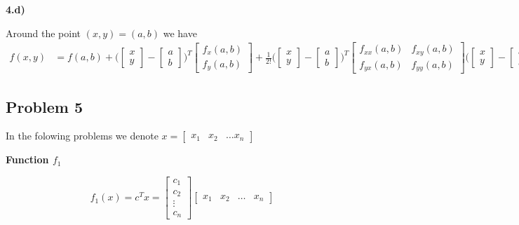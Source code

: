 \textbf{4.d)}

Around the point $(x, y) = (a, b)$ we have
\begin{align*}
f(x, y) &= f(a, b) + 
\Bigg( 
	\begin{bmatrix}
    	x \\
    	y
	\end{bmatrix}
	-
	\begin{bmatrix}
    	a \\
    	b
	\end{bmatrix}
\Bigg)^T
	\begin{bmatrix}
    	f_x(a,b) \\
    	f_y(a,b)
	\end{bmatrix}
+
\frac{1}{2!}
\Bigg( 
	\begin{bmatrix}
    	x \\
    	y
	\end{bmatrix}
	-
	\begin{bmatrix}
    	a \\
    	b
	\end{bmatrix}
\Bigg)^T
	\begin{bmatrix}
    	f_{xx}(a,b) & f_{xy}(a,b)\\
    	f_{yx}(a,b) & f_{yy}(a,b)
	\end{bmatrix}
\Bigg( 
	\begin{bmatrix}
    	x \\
    	y
	\end{bmatrix}
	-
	\begin{bmatrix}
    	a \\
    	b
	\end{bmatrix}
\Bigg)
\end{align*}

\subsection{Problem 5}

In the folowing problems we denote $x = \begin{bmatrix}x_1 & x_2 & \ldots x_n \end{bmatrix}$

\textbf{Function $f_1$}

\[
f_1(x) = c^T x =
\begin{bmatrix}
	c_1 \\ c_2 \\ \vdots \\ c_n
\end{bmatrix}
\begin{bmatrix}
	x_1 & x_2 & \ldots & x_n
\end{bmatrix}
\]

